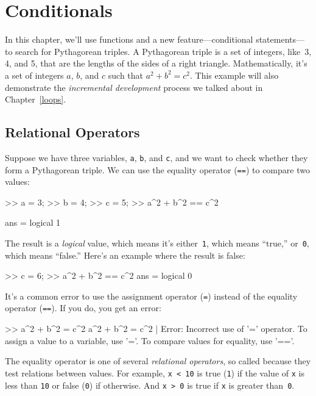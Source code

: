 \chapter{Conditionals}


In this chapter, we'll use functions and a new feature---conditional statements---to search for Pythagorean triples.
A Pytha\-gorean triple is a set of integers, like~3, 4, and 5,
that are the lengths of the sides of a right triangle.  Mathematically, it's a set of integers $a$, $b$, and $c$ such that $a^2 + b^2 = c^2$.
This example will also demonstrate the \emph{incremental development} process we talked about in Chapter~\ref{loops}.


\section{Relational Operators}

Suppose we have three variables, \lstinline{a}, \lstinline{b}, and \lstinline{c}, and we want to check whether they form a Pythagorean triple.  We can use the equality operator (\lstinline{==}) to compare two values:

\begin{code}
>> a = 3;
>> b = 4;
>> c = 5;
>> a^2 + b^2 == c^2

ans = logical 1
\end{code}

The result is a \emph{logical} value, which means it's either~\lstinline{1}, which means ``true,'' or~\lstinline{0}, which means ``false.''  Here's an example where the result is false:

\begin{code}
>> c = 6;
>> a^2 + b^2 == c^2
ans = logical 0
\end{code}

It's a common error to use the assignment operator (\lstinline{=}) instead of the equality operator (\lstinline{==}).  If you do, you get an error:

\begin{code}
>> a^2 + b^2 = c^2
 a^2 + b^2 = c^2
           |
Error: Incorrect use of '=' operator.
To assign a value to a variable, use '='.
To compare values for equality, use '=='.
\end{code}

The equality operator is one of several \emph{relational operators}, so called because they test relations between values.
For example, \lstinline{x < 10} is true (\lstinline{1}) if the value of \lstinline{x} is less than \lstinline{10} or false (\lstinline{0}) if otherwise.  And \lstinline{x > 0} is true if \lstinline{x} is greater than~\lstinline{0}.

